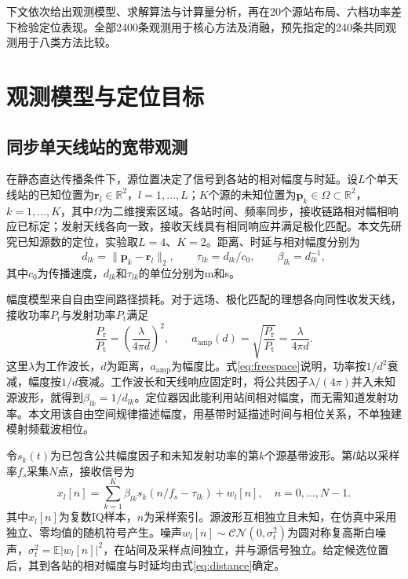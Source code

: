 \documentclass[a4paper,fleqn]{cas-sc}
\numberwithin{equation}{section}
\numberwithin{figure}{section}
\numberwithin{table}{section}
\newcommand{\R}{\mathbb R}
\newcommand{\E}{\mathbb E}
\begin{document}
下文依次给出观测模型、求解算法与计算量分析，再在20个源站布局、六档功率差下检验定位表现。全部2400条观测用于核心方法及消融，预先指定的240条共同观测用于八类方法比较。



\section{观测模型与定位目标}\label{sec:model}
\subsection{同步单天线站的宽带观测}
在静态直达传播条件下，源位置决定了信号到各站的相对幅度与时延。设$L$个单天线站的已知位置为$\bm r_l\in\R^2$，$l=1,\ldots,L$；$K$个源的未知位置为$\bm p_k\in\Omega\subset\R^2$，$k=1,\ldots,K$，其中$\Omega$为二维搜索区域。各站时间、频率同步，接收链路相对幅相响应已标定；发射天线各向一致，接收天线具有相同响应并满足极化匹配。本文先研究已知源数的定位，实验取$L=4$、$K=2$。距离、时延与相对幅度分别为
\begin{equation}
 d_{lk}=\|\bm p_k-\bm r_l\|_2,\qquad
 \tau_{lk}=d_{lk}/c_0,\qquad \beta_{lk}=d_{lk}^{-1},
 \label{eq:distance}
\end{equation}
其中$c_0$为传播速度，$d_{lk}$和$\tau_{lk}$的单位分别为m和s。

幅度模型来自自由空间路径损耗。对于远场、极化匹配的理想各向同性收发天线，接收功率$P_{\mathrm r}$与发射功率$P_{\mathrm t}$满足\cite{ITURP5252024}
\begin{equation}
 \frac{P_{\mathrm r}}{P_{\mathrm t}}
 =\left(\frac{\lambda}{4\pi d}\right)^2,\qquad
 a_{\mathrm{amp}}(d)=\sqrt{\frac{P_{\mathrm r}}{P_{\mathrm t}}}
 =\frac{\lambda}{4\pi d} .\label{eq:freespace}
\end{equation}
这里$\lambda$为工作波长，$d$为距离，$a_{\mathrm{amp}}$为幅度比。式\eqref{eq:freespace}说明，功率按$1/d^2$衰减，幅度按$1/d$衰减。工作波长和天线响应固定时，将公共因子$\lambda/(4\pi)$并入未知源波形，就得到$\beta_{lk}=1/d_{lk}$。定位器因此能利用站间相对幅度，而无需知道发射功率。本文用该自由空间规律描述幅度，用基带时延描述时间与相位关系，不单独建模射频载波相位。

令$s_k(t)$为已包含公共幅度因子和未知发射功率的第$k$个源基带波形。第$l$站以采样率$f_s$采集$N$点，接收信号为
\begin{equation}
 x_l[n]=\sum_{k=1}^{K}\beta_{lk}s_k(n/f_s-\tau_{lk})+w_l[n],
 \quad n=0,\ldots,N-1 .\label{eq:time}
\end{equation}
其中$x_l[n]$为复数IQ样本，$n$为采样索引。源波形互相独立且未知，在仿真中采用独立、零均值的随机符号产生。噪声$w_l[n]\sim\mathcal{CN}(0,\sigma_t^2)$为圆对称复高斯白噪声，$\sigma_t^2=\E|w_l[n]|^2$，在站间及采样点间独立，并与源信号独立。给定候选位置后，其到各站的相对幅度与时延均由式\eqref{eq:distance}确定。
\end{document}
